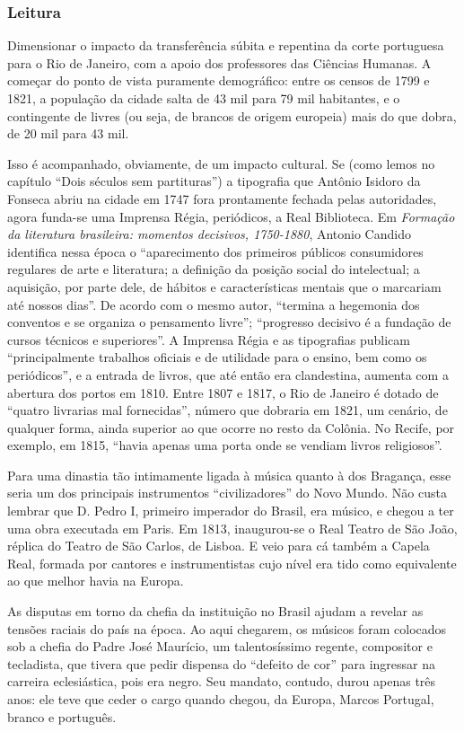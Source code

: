 \documentclass[11pt]{extarticle}
\begin{document}
\subsubsection{Leitura}

Dimensionar o impacto da transferência súbita e repentina da corte portuguesa
para o Rio de Janeiro, com a apoio dos professores das Ciências Humanas. A começar do ponto de vista puramente demográfico: entre
os censos de 1799 e 1821, a população da cidade salta de 43 mil para 79 mil
habitantes, e o contingente de livres (ou seja, de brancos de origem europeia)
mais do que dobra, de 20 mil para 43 mil. 

Isso é acompanhado, obviamente, de um impacto cultural. Se (como lemos no
capítulo ``Dois séculos sem partituras'') a tipografia que Antônio Isidoro da
Fonseca abriu na cidade em 1747 fora prontamente fechada pelas autoridades,
agora funda-se uma Imprensa Régia, periódicos, a Real Biblioteca. Em \emph{Formação
da literatura brasileira: momentos decisivos, 1750-1880}, Antonio Candido
identifica nessa época o “aparecimento dos primeiros públicos consumidores
regulares de arte e literatura; a definição da posição social do intelectual; a
aquisição, por parte dele, de hábitos e características mentais que o marcariam
até nossos dias”. De acordo com o mesmo autor, “termina a hegemonia dos
conventos e se organiza o pensamento livre”; “progresso decisivo é a fundação
de cursos técnicos e superiores”. A Imprensa Régia e as tipografias publicam
“principalmente trabalhos oficiais e de utilidade para o ensino, bem como os
periódicos”, e a entrada de livros, que até então era clandestina, aumenta com
a abertura dos portos em 1810. Entre 1807 e 1817, o Rio de Janeiro é dotado de
“quatro livrarias mal fornecidas”, número que dobraria em 1821, um cenário, de
qualquer forma, ainda superior ao que ocorre no resto da Colônia. No Recife,
por exemplo, em 1815, “havia apenas uma porta onde se vendiam livros
religiosos”.

Para uma dinastia tão intimamente ligada à música quanto à dos Bragança, esse
seria um dos principais instrumentos “civilizadores” do Novo Mundo. Não custa
lembrar que D. Pedro I, primeiro imperador do Brasil, era músico, e chegou a
ter uma obra executada em Paris. Em 1813, inaugurou-se o Real Teatro de São
João, réplica do Teatro de São Carlos, de Lisboa. E veio para cá também a
Capela Real, formada por cantores e instrumentistas cujo nível era tido como
equivalente ao que melhor havia na Europa.

As disputas em torno da chefia da instituição no Brasil ajudam a revelar as
tensões raciais do país na época. Ao aqui chegarem, os músicos foram colocados
sob a chefia do Padre José Maurício, um talentosíssimo regente, compositor e
tecladista, que tivera que pedir dispensa do “defeito de cor” para ingressar na
carreira eclesiástica, pois era negro. Seu mandato, contudo, durou apenas três
anos: ele teve que ceder o cargo quando chegou, da Europa, Marcos Portugal,
branco e português.
\end{document}
